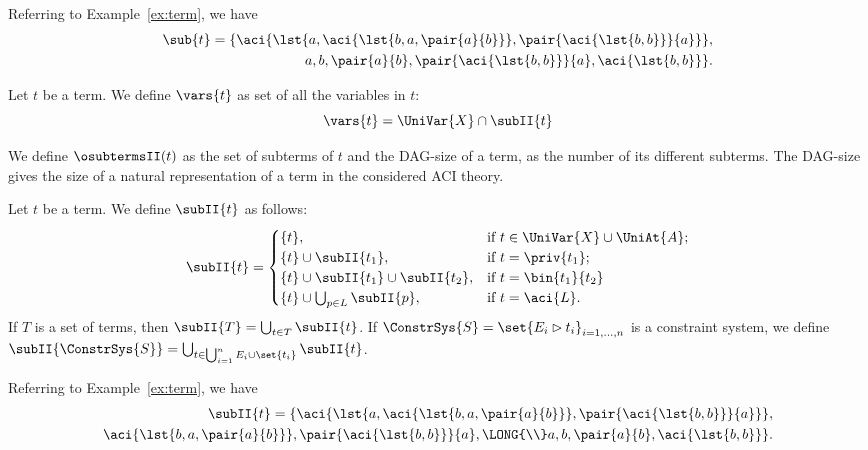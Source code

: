 \begin{example}
 Referring to Example~\ref{ex:term}, we have
\begin{align*}
\sub{t}=\{
\aci{\lst{a, \aci{\lst{b,a,\pair{a}{b}}},\pair{\aci{\lst{b,b}}}{a}}}, \\
a,b,\pair{a}{b},\pair{\aci{\lst{b,b}}}{a}, \aci{\lst{b,b}}
\}.
\end{align*}
\end{example}




\begin{df}\label{df:vars}
 Let $t$ be a term. We define $\vars{t}$ as set of all the variables in $t$:
\[
\vars{t} = \UniVar{X} \cap \subII{t}
\]
\end{df}










We define $\osubtermsII(t)$ as the set of subterms of $t$ 
and the  DAG-size of a term, as the number of its different subterms. 
The DAG-size gives the size of a natural representation of a term in the 
considered ACI theory. 

\begin{df}\label{df:subdag}
 Let $t$ be a term. We define $\subII{t}$ as follows:
\[
\subII{t} =
 \begin{cases}
    \{t\}, & \mbox{if } t \in \UniVar{X} \cup \UniAt{A};\\
    \{t\} \cup \subII{t_1}, & \mbox{if } t = \priv{t_1};\\
    \{t\} \cup \subII{t_1} \cup \subII{t_2}, & \mbox{if } t = \bin{t_1}{t_2}\\
\{t\} \cup \bigcup_{p\in L}\subII{p}, & \mbox{if } t = \aci{L}.
 \end{cases}
\]
If $T$ is a set of terms, then $\subII{T} = \bigcup_{t \in T}{\subII{t}}$.
If $\ConstrSys{S}=\set{E_i\rhd t_i}_{i=1,\dots, n}$ is a constraint system, we define $\subII{\ConstrSys{S}} = \bigcup_{t \in \bigcup_{i=1}^n E_i\cup\set{t_i}}{\subII{t}}$.
\end{df}

\begin{example}
 Referring to Example~\ref{ex:term}, we have
\begin{align*}
\subII{t}=\{
\aci{\lst{a, \aci{\lst{b,a,\pair{a}{b}}},\pair{\aci{\lst{b,b}}}{a}}}, \\
\aci{\lst{b,a,\pair{a}{b}}}, \pair{\aci{\lst{b,b}}}{a}, \LONG{\\}
a,b,\pair{a}{b}, \aci{\lst{b,b}}
\}.
\end{align*}
\end{example}




